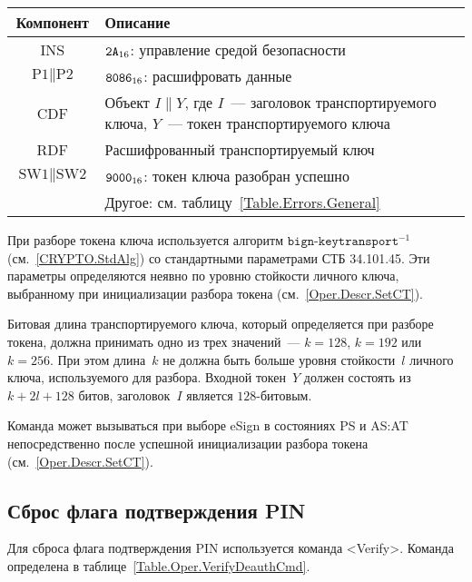 \begin{table}[hbt]
\caption{}\label{Table.Oper.DecipherCmd}
\begin{tabular}{|c|p{14cm}|}
\hline
Компонент & Описание\\ 
\hline
\hline
INS & $\texttt{2A}_{16}$: управление средой безопасности \\
\hline
$\text{P1} \parallel \text{P2}$ & $\texttt{8086}_{16}$: расшифровать
данные \\ 
\hline
CDF & Объект $I \parallel Y$, где $I$~--- заголовок транспортируемого ключа, 
$Y$~--- токен транспортируемого ключа \\
\hline 
\hline
RDF &  Расшифрованный транспортируемый ключ\\
\hline
$\text{SW1} \parallel \text{SW2}$ & $\texttt{9000}_{16}$: токен ключа 
разобран успешно\\
\cline{2-2}
& Другое: см. таблицу~\ref{Table.Errors.General} \\
\hline
\end{tabular}
\end{table}

При разборе токена ключа используется алгоритм $\texttt{bign-keytransport}^{-1}$
(см.~\ref{CRYPTO.StdAlg}) со стандартными параметрами СТБ 34.101.45.
%
Эти параметры определяются неявно по уровню стойкости личного ключа,
выбранному при инициализации разбора токена (см.~\ref{Oper.Descr.SetCT}).

Битовая длина транспортируемого ключа, который определяется при разборе токена, 
должна принимать одно из трех значений~--- $k=128$, $k=192$ или $k=256$. 
При этом длина~$k$ не должна быть больше уровня стойкости~$l$ личного ключа, 
используемого для разбора. 
%
Входной токен~$Y$ должен состоять из~$k+2l+128$ битов,
заголовок~$I$ является $128$-битовым.

Команда может вызываться при выборе eSign в состояниях 
PS и AS:AT непосредственно после успешной инициализации 
разбора токена (см.~\ref{Oper.Descr.SetCT}).

\subsection{Сброс флага подтверждения PIN}
\label{Oper.Descr.VerifyDeauth}

Для сброса флага подтверждения PIN используется команда <Verify>.
Команда определена в таблице~\ref{Table.Oper.VerifyDeauthCmd}.

